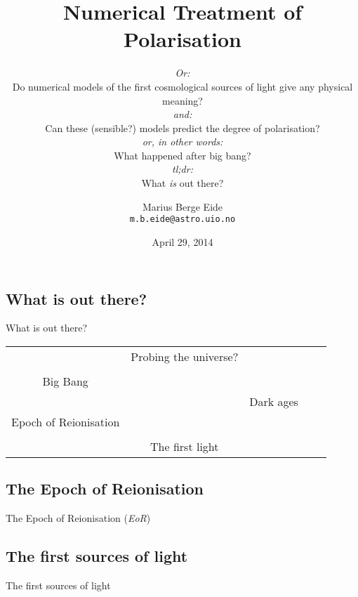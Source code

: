 \documentclass[]{article}
\date{April 29, 2014}
\title{Numerical Treatment of Polarisation}
\subtitle{ \textit{\footnotesize\textcolor{solarizedBase1}{ Or:}}\\ Do numerical models of the first cosmological sources of light give any physical meaning?\\
\textit{\footnotesize\textcolor{solarizedBase1}{ and:}} \\
Can these (sensible?) models predict the degree of polarisation?\\
\textit{\footnotesize\textcolor{solarizedBase1}{ or, in other words:}}\\
What happened after big bang?\\
\textit{\footnotesize\textcolor{solarizedBase1}{ tl;dr:}}\\
What \textit{is} out there?}
\author{Marius Berge Eide \\ \texttt{m.b.eide@astro.uio.no}}
\institute[ITA UIO]{Institute of Theoretical Astrophysics, University of Oslo}
\begin{document}
\maketitle{}

\begin{frame}
\section{What is out there?}
\begin{center}
    {\huge \textcolor{solarizedBase3}{
    What is out there?}}

    \begin{table}
        \centering
        \begin{tabular*}{\textwidth}{c@{\extracolsep\fill}c c c c}
            \\
            &Probing the universe? \\ \\
            Big Bang \\
            &&Dark ages \\
            Epoch of Reionisation
            \\ \\ 
            &The first light
        \end{tabular*}
        \label{tab:EoR}
    \end{table}

\end{center}
\end{frame}

\begin{frame}
    \section{The Epoch of Reionisation}
    \begin{center}
    {\huge \textcolor{solarizedBase3}{
        The Epoch of Reionisation (\textit{EoR})
    }}
    \end{center}


\end{frame}

\begin{frame}
    \section{The first sources of light}
\begin{center}
    {\huge \textcolor{solarizedBase3}{
        The first sources of light
    }}
\end{center}
    
\end{frame}
\end{document}
